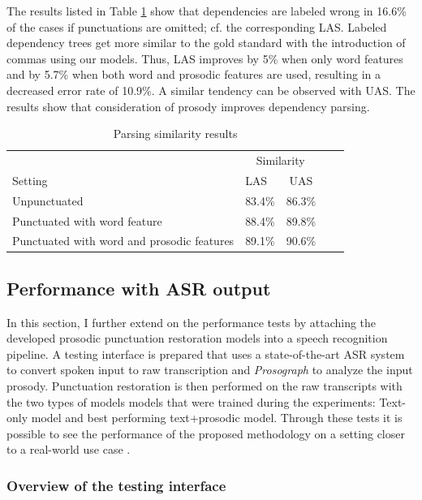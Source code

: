 The results listed in Table \ref{parsing} show that dependencies are labeled wrong in 16.6\% of the cases if punctuations are omitted; cf. the corresponding LAS. Labeled dependency trees get more similar to the gold standard with the introduction of commas using our models. Thus, LAS improves by 5\% when only word features and by 5.7\% when both word and prosodic features are used, resulting in a decreased error rate of 10.9\%. A similar tendency can be observed with UAS. The results show that consideration of prosody improves dependency parsing. 

\begin{table}[H]
	\centering
	\begin{tabular}{p{8cm}p{2cm}ccc}
		\toprule
         &  \multicolumn{2}{c}{Similarity}  \\
         Setting   							& LAS   &  UAS  \\
		\midrule
        Unpunctuated 					& 83.4\% & 86.3\% \\
		Punctuated with word feature	& 88.4\% & 89.8\% \\
		Punctuated with word and prosodic features  & 89.1\% & 90.6\% \\
		\bottomrule
	\end{tabular}
	\caption{Parsing similarity results}
	\label{parsing}
\end{table}

\subsection{Performance with ASR output}
\label{punkProse:experiments:q3}
In this section, I further extend on the performance tests by attaching the developed prosodic punctuation restoration models into a speech recognition pipeline. A testing interface is prepared that uses a state-of-the-art ASR system to convert spoken input to raw transcription and \textit{Prosograph} \citep{prosograph} to analyze the input prosody. Punctuation restoration is then performed on the raw transcripts with the two types of models models that were trained during the experiments: Text-only model and best performing text+prosodic model. Through these tests it is possible to see the performance of the proposed methodology on a setting closer to a real-world use case \citep{punkProse}.

\subsubsection{Overview of the testing interface}

